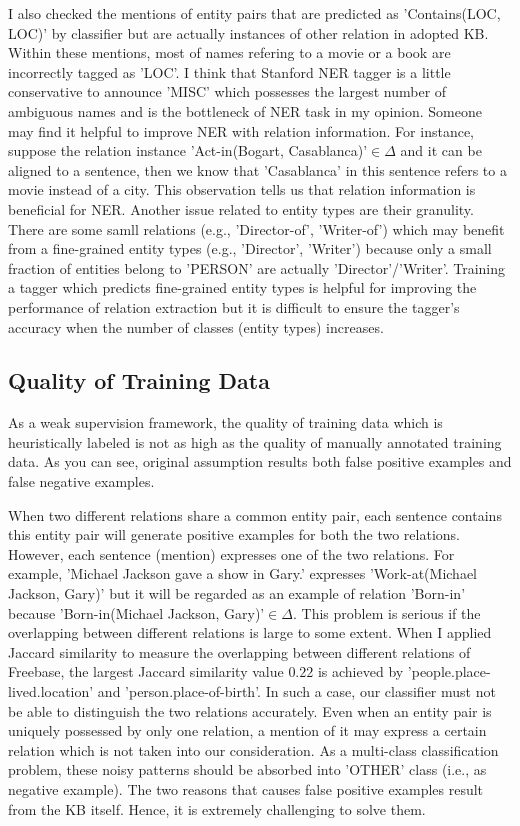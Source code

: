 \documentclass[10pt]{article} %
\theoremstyle{definition}
\theoremstyle{definition}
\begin{document}
I also checked the mentions of entity pairs that are predicted as 'Contains(LOC, LOC)' by classifier but are actually instances of other relation in adopted KB. 
Within these mentions, most of names refering to a movie or a book are incorrectly tagged as 'LOC'. 
I think that Stanford NER tagger is a little conservative to announce 'MISC' which possesses the largest number of ambiguous names and is the bottleneck of NER task in my opinion. 
Someone may find it helpful to improve NER with relation information. 
For instance, suppose the relation instance 'Act-in(Bogart, Casablanca)'$\in\Delta$ and it can be aligned to a sentence, then we know that 'Casablanca' in this sentence refers to a movie instead of a city. 
This observation tells us that relation information is beneficial for NER. 
Another issue related to entity types are their granulity. 
There are some samll relations (e.g., 'Director-of', 'Writer-of') which may benefit from a fine-grained entity types (e.g., 'Director', 'Writer') because only a small fraction of entities belong to 'PERSON' are actually 'Director'/'Writer'. 
Training a tagger which predicts fine-grained entity types is helpful for improving the performance of relation extraction but it is difficult to ensure the tagger's accuracy when the number of classes (entity types) increases. 



\subsection{Quality of Training Data}
As a weak supervision framework, the quality of training data which is heuristically labeled is not as high as the quality of manually annotated training data. 
As you can see, original assumption results both false positive examples and false negative examples. 



When two different relations share a common entity pair, each sentence contains this entity pair will generate positive examples for both the two relations. 
However, each sentence (mention) expresses one of the two relations. 
For example, 'Michael Jackson gave a show in Gary.' expresses 'Work-at(Michael Jackson, Gary)' but it will be regarded as an example of relation 'Born-in' because 'Born-in(Michael Jackson, Gary)'$\in\Delta$. 
This problem is serious if the overlapping between different relations is large to some extent. 
When I applied Jaccard similarity to measure the overlapping between different relations of Freebase, 
the largest Jaccard similarity value $0.22$ is achieved by 'people.place-lived.location' and 'person.place-of-birth'. 
In such a case, our classifier must not be able to distinguish the two relations accurately. 
Even when an entity pair is uniquely possessed by only one relation, a mention of it may express a certain relation which is not taken into our consideration. 
As a multi-class classification problem, these noisy patterns should be absorbed into 'OTHER' class (i.e., as negative example). 
The two reasons that causes false positive examples result from the KB itself.
Hence, it is extremely challenging to solve them. 
\end{document}
